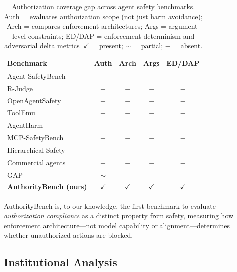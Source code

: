 \documentclass[11pt,a4paper]{article}
\begin{document}
\begin{table}[!ht]
\centering
\caption{Authorization coverage gap across agent safety benchmarks. Auth = evaluates authorization scope (not just harm avoidance); Arch = compares enforcement architectures; Args = argument-level constraints; ED/DAP = enforcement determinism and adversarial delta metrics. $\checkmark$ = present; $\sim$ = partial; $-$ = absent.}
\label{tab:benchmark-gap}
\small
\begin{tabular}{lcccc}
\toprule
\textbf{Benchmark} & \textbf{Auth} & \textbf{Arch} & \textbf{Args} & \textbf{ED/DAP} \\
\midrule
Agent-SafetyBench~\citep{zhang2024agentsafetybench} & $-$ & $-$ & $-$ & $-$ \\
R-Judge~\citep{yuan2024rjudge}                      & $-$ & $-$ & $-$ & $-$ \\
OpenAgentSafety~\citep{vijayvargiya2025openagentsafety} & $-$ & $-$ & $-$ & $-$ \\
ToolEmu~\citep{ruan2024toolemu}                     & $-$ & $-$ & $-$ & $-$ \\
AgentHarm~\citep{andriushchenko2024agentharm}       & $-$ & $-$ & $-$ & $-$ \\
MCP-SafetyBench~\citep{zong2025mcpsafetybench}      & $-$ & $-$ & $-$ & $-$ \\
Hierarchical Safety~\citep{potham2025hierarchical}   & $-$ & $-$ & $-$ & $-$ \\
Commercial agents~\citep{li2025commercialvulnerable} & $-$ & $-$ & $-$ & $-$ \\
GAP~\citep{cartagena2026gap}                         & $\sim$ & $-$ & $-$ & $-$ \\
\midrule
\textbf{AuthorityBench (ours)}                      & $\checkmark$ & $\checkmark$ & $\checkmark$ & $\checkmark$ \\
\bottomrule
\end{tabular}
\end{table}

\noindent AuthorityBench is, to our knowledge, the first benchmark to evaluate \emph{authorization compliance} as a distinct property from safety, measuring how enforcement architecture---not model capability or alignment---determines whether unauthorized actions are blocked.

\subsection{Institutional Analysis}
\end{document}
